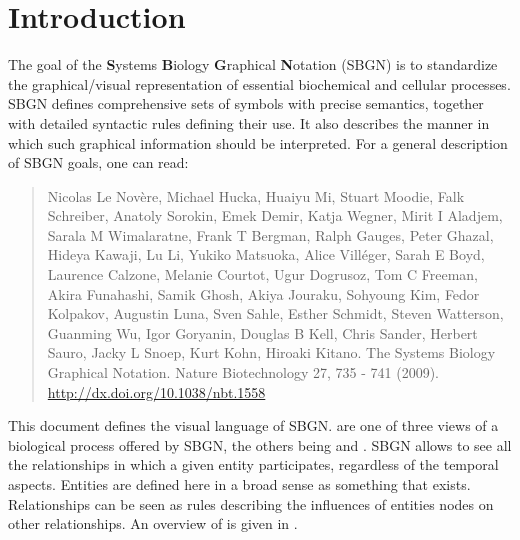 
\chapter{Introduction}

The goal of the \textbf{S}ystems \textbf{B}iology \textbf{G}raphical \textbf{N}otation (SBGN) is to standardize the graphical/visual representation of essential biochemical and cellular processes. SBGN defines comprehensive sets of symbols with precise semantics, together with detailed syntactic rules defining their use.  It also describes the manner in which such graphical information should be interpreted. For a general description of SBGN goals, one can read:

\begin{quote}
 Nicolas Le Nov\`{e}re, Michael Hucka, Huaiyu Mi, Stuart Moodie, Falk Schreiber, Anatoly Sorokin, Emek Demir, Katja Wegner, Mirit I Aladjem, Sarala M Wimalaratne, Frank T Bergman, Ralph Gauges, Peter Ghazal, Hideya Kawaji, Lu Li, Yukiko Matsuoka, Alice Villéger, Sarah E Boyd, Laurence Calzone, Melanie Courtot, Ugur Dogrusoz, Tom C Freeman, Akira Funahashi, Samik Ghosh, Akiya Jouraku, Sohyoung Kim, Fedor Kolpakov, Augustin Luna, Sven Sahle, Esther Schmidt, Steven Watterson, Guanming Wu, Igor Goryanin, Douglas B Kell, Chris Sander, Herbert Sauro, Jacky L Snoep, Kurt Kohn, Hiroaki Kitano. The Systems Biology Graphical Notation. Nature Biotechnology 27, 735 - 741 (2009).  \url{http://dx.doi.org/10.1038/nbt.1558}
\end{quote}

This document defines the \emph{\ER{}} visual language of SBGN. \ERs are one of three views of a biological process offered by SBGN, the others being \PDs and \AFs. SBGN \ERl{} allows to see all the relationships in which a given entity participates, regardless of the temporal aspects. Entities are defined here in a broad sense as something that exists. Relationships can be seen as rules describing the influences of entities nodes on other relationships. An overview of \ERs is given in .






